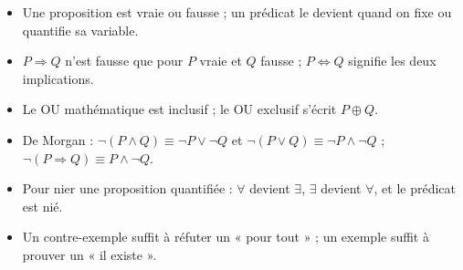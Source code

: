 \begin{summary}[À retenir]
\begin{itemize}
\item Une proposition est vraie ou fausse ; un prédicat le devient quand on fixe ou quantifie sa variable.
\item $P\Rightarrow Q$ n'est fausse que pour $P$ vraie et $Q$ fausse ; $P\Leftrightarrow Q$ signifie les deux implications.
\item Le OU mathématique est inclusif ; le OU exclusif s'écrit $P\oplus Q$.
\item De Morgan : $\lnot(P\land Q)\equiv\lnot P\lor\lnot Q$ et $\lnot(P\lor Q)\equiv\lnot P\land\lnot Q$ ; $\lnot(P\Rightarrow Q)\equiv P\land\lnot Q$.
\item Pour nier une proposition quantifiée : $\forall$ devient $\exists$, $\exists$ devient $\forall$, et le prédicat est nié.
\item Un contre-exemple suffit à réfuter un « pour tout » ; un exemple suffit à prouver un « il existe ».
\end{itemize}
\end{summary}
\ifmxteacher{}\fi
